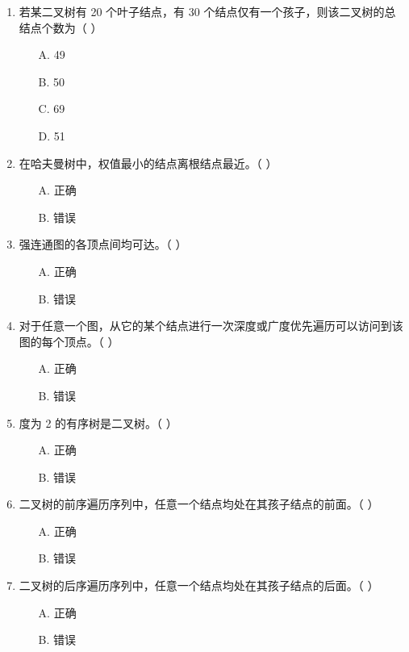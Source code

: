 \documentclass[12pt, a4paper]{article}
\begin{document}
\begin{enumerate}[label=\arabic*.]
	\item 若某二叉树有 20 个叶子结点，有 30 个结点仅有一个孩子，则该二叉树的总结点个数为（ ）
	      \begin{enumerate}
		      \item[A.] 49
		      \item[B.] 50
		      \item[C.] 69
		      \item[D.] 51
	      \end{enumerate}

	\item 在哈夫曼树中，权值最小的结点离根结点最近。（ ）
	      \begin{enumerate}
		      \item[A.] 正确
		      \item[B.] 错误
	      \end{enumerate}

	\item 强连通图的各顶点间均可达。（ ）
	      \begin{enumerate}
		      \item[A.] 正确
		      \item[B.] 错误
	      \end{enumerate}

	\item 对于任意一个图，从它的某个结点进行一次深度或广度优先遍历可以访问到该图的每个顶点。（ ）
	      \begin{enumerate}
		      \item[A.] 正确
		      \item[B.] 错误
	      \end{enumerate}

	\item 度为 2 的有序树是二叉树。（ ）
	      \begin{enumerate}
		      \item[A.] 正确
		      \item[B.] 错误
	      \end{enumerate}

	\item 二叉树的前序遍历序列中，任意一个结点均处在其孩子结点的前面。（ ）
	      \begin{enumerate}
		      \item[A.] 正确
		      \item[B.] 错误
	      \end{enumerate}

	\item 二叉树的后序遍历序列中，任意一个结点均处在其孩子结点的后面。（ ）
	      \begin{enumerate}
		      \item[A.] 正确
		      \item[B.] 错误
	      \end{enumerate}


\end{enumerate}
\end{document}
